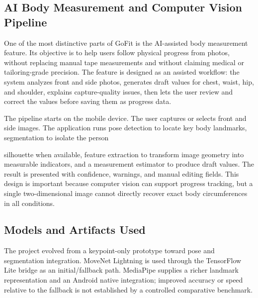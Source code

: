 \documentclass[12pt,a4paper,openany]{report}
\begin{document}
\subsection{AI Body Measurement and Computer Vision Pipeline}

One of the most distinctive parts of GoFit is the AI-assisted body measurement feature. Its objective is to help users follow physical progress from photos, without replacing manual tape measurements and without claiming medical or tailoring-grade precision. The feature is designed as an assisted workflow: the system analyzes front and side photos, generates draft values for chest, waist, hip, and shoulder, explains capture-quality issues, then lets the user review and correct the values before saving them as progress data.


The pipeline starts on the mobile device. The user captures or selects front and side images. The application runs pose detection to locate key body landmarks, segmentation to isolate the person


silhouette when available, feature extraction to transform image geometry into measurable indicators, and a measurement estimator to produce draft values. The result is presented with confidence, warnings, and manual editing fields. This design is important because computer vision can support progress tracking, but a single two-dimensional image cannot directly recover exact body circumferences in all conditions.


\subsection{Models and Artifacts Used}

The project evolved from a keypoint-only prototype toward pose and segmentation integration. MoveNet Lightning is used through the TensorFlow Lite bridge as an initial/fallback path. MediaPipe supplies a richer landmark representation and an Android native integration; improved accuracy or speed relative to the fallback is not established by a controlled comparative benchmark.
\end{document}
